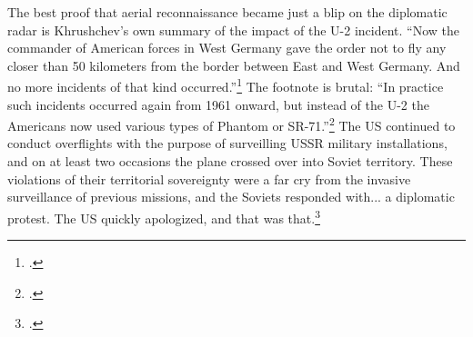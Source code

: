 \documentclass[12pt]{article}
\begin{document}
The best proof that aerial reconnaissance became just a blip on the diplomatic radar is Khrushchev's own summary of the impact of the U-2 incident. ``Now the commander of American forces in West Germany gave the order not to fly any closer than 50 kilometers from the border between East and West Germany. And no more incidents of that kind occurred.''\footcite[p.~256]{khrushchev_memoirs_2007} The footnote is brutal: ``In practice such incidents occurred again from 1961 onward, but instead of the U-2 the Americans now used various types of Phantom or SR-71.''\footcite[p.~258]{khrushchev_memoirs_2007} The US continued to conduct overflights with the purpose of surveilling USSR military installations, and on at least two occasions the plane crossed over into Soviet territory. These violations of their territorial sovereignty were a far cry from the invasive surveillance of previous missions, and the Soviets responded with... a diplomatic protest. The US quickly apologized, and that was that.\footcite{orlov_u-2_2007}



\end{document}
